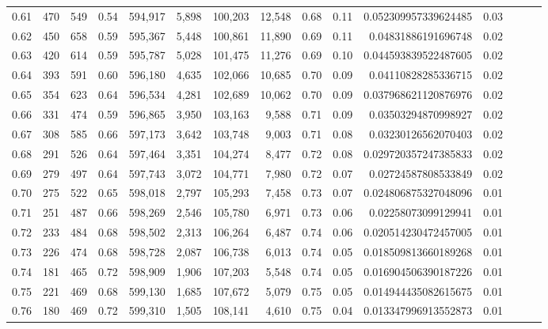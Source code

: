 \begin{tabular}{rrrrrrrrrrrrrrr}
0.61 &     470 &    549 &  0.54 &  594,917 &    5,898 &  100,203 &   12,548 &  0.68 &  0.11 &    0.052309957339624485 &      0.03 \\
0.62 &     450 &    658 &  0.59 &  595,367 &    5,448 &  100,861 &   11,890 &  0.69 &  0.11 &     0.04831886191696748 &      0.02 \\
0.63 &     420 &    614 &  0.59 &  595,787 &    5,028 &  101,475 &   11,276 &  0.69 &  0.10 &    0.044593839522487605 &      0.02 \\
0.64 &     393 &    591 &  0.60 &  596,180 &    4,635 &  102,066 &   10,685 &  0.70 &  0.09 &     0.04110828285336715 &      0.02 \\
0.65 &     354 &    623 &  0.64 &  596,534 &    4,281 &  102,689 &   10,062 &  0.70 &  0.09 &    0.037968621120876976 &      0.02 \\
0.66 &     331 &    474 &  0.59 &  596,865 &    3,950 &  103,163 &    9,588 &  0.71 &  0.09 &     0.03503294870998927 &      0.02 \\
0.67 &     308 &    585 &  0.66 &  597,173 &    3,642 &  103,748 &    9,003 &  0.71 &  0.08 &     0.03230126562070403 &      0.02 \\
0.68 &     291 &    526 &  0.64 &  597,464 &    3,351 &  104,274 &    8,477 &  0.72 &  0.08 &    0.029720357247385833 &      0.02 \\
0.69 &     279 &    497 &  0.64 &  597,743 &    3,072 &  104,771 &    7,980 &  0.72 &  0.07 &     0.02724587808533849 &      0.02 \\
0.70 &     275 &    522 &  0.65 &  598,018 &    2,797 &  105,293 &    7,458 &  0.73 &  0.07 &    0.024806875327048096 &      0.01 \\
0.71 &     251 &    487 &  0.66 &  598,269 &    2,546 &  105,780 &    6,971 &  0.73 &  0.06 &     0.02258073099129941 &      0.01 \\
0.72 &     233 &    484 &  0.68 &  598,502 &    2,313 &  106,264 &    6,487 &  0.74 &  0.06 &    0.020514230472457005 &      0.01 \\
0.73 &     226 &    474 &  0.68 &  598,728 &    2,087 &  106,738 &    6,013 &  0.74 &  0.05 &    0.018509813660189268 &      0.01 \\
0.74 &     181 &    465 &  0.72 &  598,909 &    1,906 &  107,203 &    5,548 &  0.74 &  0.05 &    0.016904506390187226 &      0.01 \\
0.75 &     221 &    469 &  0.68 &  599,130 &    1,685 &  107,672 &    5,079 &  0.75 &  0.05 &    0.014944435082615675 &      0.01 \\
0.76 &     180 &    469 &  0.72 &  599,310 &    1,505 &  108,141 &    4,610 &  0.75 &  0.04 &    0.013347996913552873 &      0.01 \\

\end{tabular}
